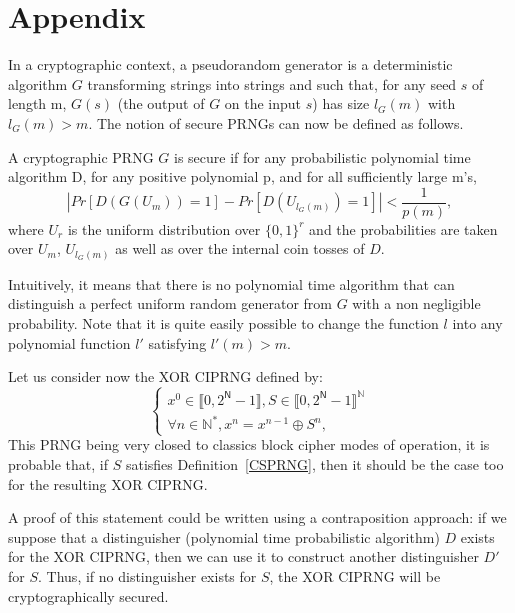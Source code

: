 \chapter{Appendix}
\label{appendix}
In a cryptographic context, a pseudorandom generator is a deterministic algorithm $G$ transforming strings into strings and such that, for any seed 
$s$ of length m, $G(s)$ (the output of $G$ on the input $s$) has size $l_G(m)$ with $l_G(m) > m$. The notion of secure 
PRNGs can now be defined as follows.

\begin{definition}
\label{CSPRNG}
A cryptographic PRNG $G$ is secure if for any probabilistic polynomial time algorithm D, for any positive polynomial p, 
and for all sufficiently large m's,  
\begin{equation}
\left|Pr[D(G(U_m))=1]-Pr[D(U_{l_G(m)})=1]\right|<\frac{1}{p(m)},
\end{equation}
where $U_r$ is the uniform distribution over $\{0, 1\}^r$ and the probabilities are taken over $U_m$, 
$U_{l_G(m)}$ as well as over the internal coin tosses of $D$.
\end{definition}

Intuitively, it means that there is no polynomial time algorithm that can distinguish a perfect uniform 
random generator from $G$ with a non negligible probability. Note that it is quite easily possible to change 
the function $l$ into any polynomial function $l'$ satisfying $l'(m)>m$. 

Let us consider now the XOR CIPRNG defined by:
\begin{equation}
\left\{
\begin{array}{l}
x^0 \in \llbracket 0, 2^\mathsf{N}-1 \rrbracket, S \in \llbracket 0, 2^\mathsf{N}-1 \rrbracket^\mathds{N} \\
\forall n \in \mathds{N}^*, x^n = x^{n-1} \oplus S^n,
\end{array}
\right.
\label{equation Oplus}
\end{equation}
This PRNG being very closed to classics block cipher modes of operation, it is probable that, if
$S$ satisfies Definition~\ref{CSPRNG}, then it should be the case too for the resulting XOR CIPRNG.

A proof of this statement could be written using a contraposition approach: 
if we suppose that a distinguisher (polynomial time probabilistic algorithm) $D$ exists for the XOR CIPRNG, then we
can use it to construct another distinguisher $D'$ for $S$. Thus, if no 
distinguisher exists for $S$, the XOR CIPRNG will be cryptographically secured.

